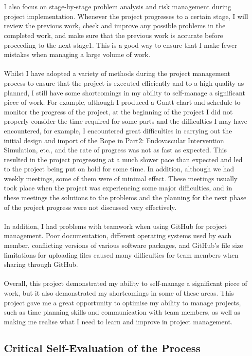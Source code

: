 \documentclass[12pt]{article}
\begin{document}
\\\\
I also focus on stage-by-stage problem analysis and risk management during project implementation. Whenever the project progresses to a certain stage, I will review the previous work, check and improve any possible problems in the completed work, and make sure that the previous work is accurate before proceeding to the next stage1. This is a good way to ensure that I make fewer mistakes when managing a large volume of work.
\\\\
Whilst I have adopted a variety of methods during the project management process to ensure that the project is executed efficiently and to a high quality as planned, I still have some shortcomings in my ability to self-manage a significant piece of work. For example, although I produced a Gantt chart and schedule to monitor the progress of the project, at the beginning of the project I did not properly consider the time required for some parts and the difficulties I may have encountered, for example, I encountered great difficulties in carrying out the initial design and import of the Rope in Part2: Endovascular Intervention Simulation, etc., and the rate of progress was not as fast as expected. This resulted in the project progressing at a much slower pace than expected and led to the project being put on hold for some time. In addition, although we had weekly meetings, some of them were of minimal effect. These meetings usually took place when the project was experiencing some major difficulties, and in these meetings the solutions to the problems and the planning for the next phase of the project progress were not discussed very effectively.
\\\\
In addition, I had problems with teamwork when using GitHub for project management. Poor documentation, different operating systems used by each member, conflicting versions of various software packages, and GitHub's file size limitations for uploading files caused many difficulties for team members when sharing through GitHub.
\\\\
Overall, this project demonstrated my ability to self-manage a significant piece of work, but it also demonstrated my shortcomings in some of these areas. This project gave me a great opportunity to optimise my ability to manage projects, such as time planning skills and communication with team members, as well as making me realise what I need to learn and improve in project management.
\subsection{Critical Self-Evaluation of the Process}


\printbibliography
\printglossaries
\end{document}
